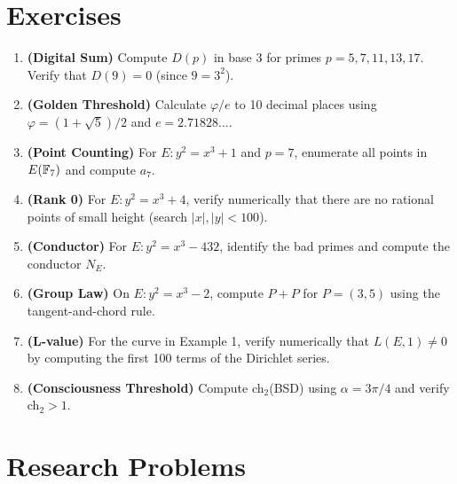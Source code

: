 \section*{Exercises}

\begin{enumerate}
\item \textbf{(Digital Sum)} Compute $D(p)$ in base 3 for primes $p = 5, 7, 11, 13, 17$. Verify that $D(9) = 0$ (since $9 = 3^2$).

\item \textbf{(Golden Threshold)} Calculate $\varphi/e$ to 10 decimal places using $\varphi = (1+\sqrt{5})/2$ and $e = 2.71828...$.

\item \textbf{(Point Counting)} For $E: y^2 = x^3 + 1$ and $p = 7$, enumerate all points in $E(\mathbb{F}_7)$ and compute $a_7$.

\item \textbf{(Rank 0)} For $E: y^2 = x^3 + 4$, verify numerically that there are no rational points of small height (search $|x|, |y| < 100$).

\item \textbf{(Conductor)} For $E: y^2 = x^3 - 432$, identify the bad primes and compute the conductor $N_E$.

\item \textbf{(Group Law)} On $E: y^2 = x^3 - 2$, compute $P + P$ for $P = (3, 5)$ using the tangent-and-chord rule.

\item \textbf{(L-value)} For the curve in Example 1, verify numerically that $L(E, 1) \neq 0$ by computing the first 100 terms of the Dirichlet series.

\item \textbf{(Consciousness Threshold)} Compute ch$_2$(BSD) using $\alpha = 3\pi/4$ and verify ch$_2 > 1$.
\end{enumerate}

\section*{Research Problems}

